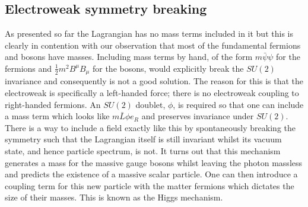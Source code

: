 \subsection{Electroweak symmetry breaking}

As presented so far the \SM Lagrangian has no mass terms included in it but this is clearly in contention with our observation that most of the fundamental fermions and bosons have masses. Including mass terms by hand, of the form $m\bar{\psi}\psi$ for the fermions and $\frac{1}{2}m^{2}B^{\mu}B_{\mu}$ for the bosons, would explicitly break the $SU(2)$ invariance and consequently is not a good solution. The reason for this is that the electroweak is specifically a left-handed force; there is no electroweak coupling to right-handed fermions. An $SU(2)$ doublet, $\phi$, is required so that one can include a mass term which looks like $m\bar{L}\phi e_{R}$ and preserves invariance under $SU(2)$. There is a way to include a field exactly like this by spontaneously breaking the symmetry such that the Lagrangian itself is still invariant whilst its vacuum state, and hence particle spectrum, is not. It turns out that this mechanism generates a mass for the massive gauge bosons whilst leaving the photon massless and predicts the existence of a massive scalar particle. One can then introduce a coupling term for this new particle with the matter fermions which dictates the size of their masses. This is known as the Higgs mechanism.

